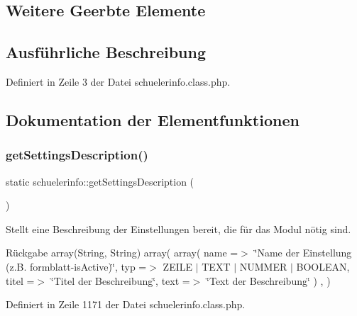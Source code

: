 \subsection*{Weitere Geerbte Elemente}


\subsection{Ausführliche Beschreibung}


Definiert in Zeile 3 der Datei schuelerinfo.\+class.\+php.



\subsection{Dokumentation der Elementfunktionen}
\mbox{\label{classschuelerinfo_a9d6ca22d0230a7cacdd8bf6b577ddf9c}} 
\subsubsection{\texorpdfstring{get\+Settings\+Description()}{getSettingsDescription()}}
{\footnotesize\ttfamily static schuelerinfo\+::get\+Settings\+Description (\begin{DoxyParamCaption}{ }\end{DoxyParamCaption})\hspace{0.3cm}{\ttfamily [static]}}

Stellt eine Beschreibung der Einstellungen bereit, die für das Modul nötig sind. \begin{DoxyReturn}{Rückgabe}
array(\+String, String) array( array( \textquotesingle{}name\textquotesingle{} =$>$ \char`\"{}\+Name der Einstellung (z.\+B. formblatt-\/is\+Active)\char`\"{}, \textquotesingle{}typ\textquotesingle{} =$>$ Z\+E\+I\+LE $\vert$ T\+E\+XT $\vert$ N\+U\+M\+M\+ER $\vert$ B\+O\+O\+L\+E\+AN, \textquotesingle{}titel\textquotesingle{} =$>$ \char`\"{}\+Titel der Beschreibung\char`\"{}, \textquotesingle{}text\textquotesingle{} =$>$ \char`\"{}\+Text der Beschreibung\char`\"{} ) , ) 
\end{DoxyReturn}


Definiert in Zeile 1171 der Datei schuelerinfo.\+class.\+php.

\mbox{\label{classschuelerinfo_afea1a1c3f6b20ca1ffb28bbefeec694e}} 
